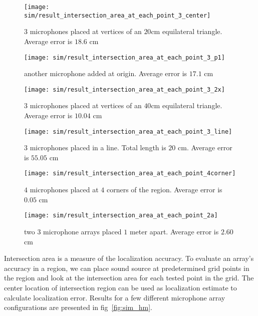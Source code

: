 \begin{figure*}[]
  \centering
  \begin{subfigure}[]{.3\textwidth}
    \texttt{[image: sim/result\_intersection\_area\_at\_each\_point\_3\_center]}
    \caption{$3$ microphones placed at vertices of an $20$cm equilateral triangle. Average error is $18.6$ cm}
    \label{fig:sim_hm_3}
  \end{subfigure}
  \begin{subfigure}[]{.3\textwidth}
    \texttt{[image: sim/result\_intersection\_area\_at\_each\_point\_3\_p1]}
    \caption{another microphone added at origin. Average error is $17.1$ cm}
    \label{fig:sim_hm_3_p1}
  \end{subfigure}
  \begin{subfigure}[]{.3\textwidth}
    \texttt{[image: sim/result\_intersection\_area\_at\_each\_point\_3\_2x]}
    \caption{$3$ microphones placed at vertices of an $40$cm equilateral triangle. Average error is $10.04$ cm}
    \label{fig:sim_hm_3_2x}
  \end{subfigure}
  \begin{subfigure}[]{.3\textwidth}
    \texttt{[image: sim/result\_intersection\_area\_at\_each\_point\_3\_line]}
    \caption{$3$ microphones placed in a line. Total length is $20$ cm. Average error is $55.05$ cm}
    \label{fig:sim_hm_3_line}
  \end{subfigure}
  \begin{subfigure}[]{.3\textwidth}
    \texttt{[image: sim/result\_intersection\_area\_at\_each\_point\_4corner]}
    \caption{$4$ microphones placed at $4$ corners of the region. Average error is $0.05$ cm}
    \label{fig:sim_hm_4}
  \end{subfigure}
  \begin{subfigure}[]{.3\textwidth}
    \texttt{[image: sim/result\_intersection\_area\_at\_each\_point\_2a]}
    \caption{two $3$ microphone arrays placed $1$ meter apart. Average error is $2.60$ cm}
    \label{fig:sim_hm_2_array}
  \end{subfigure}
  \caption{Accuracy for different array configurations}
  \label{fig:sim_hm}
\end{figure*}

Intersection area is a measure of the localization accuracy. To evaluate an array's accuracy in a region, we can place sound source at predetermined grid points in the region and look at the intersection area for each tested point in the grid. The center location of intersection region can be used as localization estimate to calculate localization error. Results for a few different microphone array configurations are presented in fig~\ref{fig:sim_hm}.

